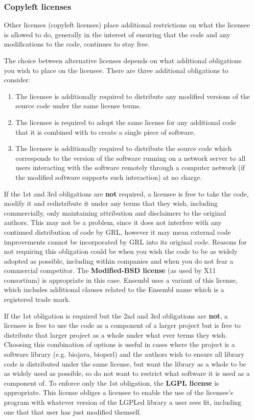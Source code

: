 \documentclass[10pt,a4paper]{article}
\begin{document}
\subsubsection{Copyleft licenses}
\par Other licenses (copyleft licenses) place additional restrictions on what the 
licensee is allowed to do, generally in the interest of ensuring that the code and 
any modifications to the code, continues to stay free. 

The choice between alternative licenses depends on 
what additional obligations you wish to place on the licensee. There are three additional obligations to consider: 

\begin{enumerate}
\item The licensee is additionally required to distribute any modified versions of the 
source code under the same license terms. 
\item The licensee is required to adopt the same license for any additional code that it 
is combined with to create a single piece of software. 
\item The licensee is additionally required to distribute the source code which 
corresponds to the version of the software running on a network server to all 
users interacting with the software remotely through a computer network (if the 
modified software supports such interaction) at no charge. 
\end{enumerate}

If the 1st and 3rd obligations are \textbf{not} required, a licensee is free to take the code, modify 
it and redistribute it under any terms that they wish, including commercially, only 
maintaining attribution and disclaimers to the original authors. This may not be a 
problem, since it does not interfere with any continued distribution of code by GRL, 
however it may mean external code improvements cannot be incorporated by GRL into 
its original code. Reasons for not requiring this obligation could be when you wish the 
code to be as widely adopted as possible, including within companies and when you do 
not fear a commercial competitor. The \textbf{Modified-BSD license} (as used by X11 
consortium) is appropriate in this case. Ensembl uses a variant of this license, which 
includes additional clauses related to the Ensembl name which is a registered trade 
mark. 
 
If the 1st obligation is required but the 2nd and 3rd obligations are \textbf{not}, a licensee is free 
to use the code as a component of a larger project but is free to distribute that larger 
project as a whole under what ever terms they wish. Choosing this combination of 
options is useful in cases where the project is a software library (e.g. biojava, bioperl) 
and the authors wish to ensure all library code is distributed under the same license, 
but want the library as a whole to be as widely used as possible, so do not want to 
restrict what software it is used as a component of. To enforce only the 1st obligation, 
the \textbf{LGPL license} is appropriate. This license obliges a licensee to enable the use of the 
licensee's program with whatever version of the LGPLed library a user sees fit, 
including one that that user has just modified themself. 
\end{document}
